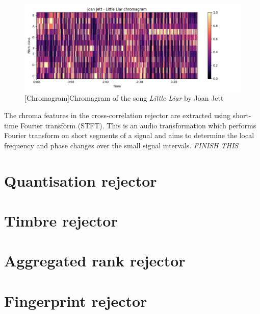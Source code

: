 \begin{figure}[H]
    \centering
    \includegraphics[width=\textwidth]{Algorithms/chromagram_picture.png}
    [Chromagram]{Chromagram of the song \textit{Little Liar} by Joan Jett}
    \label{fig:chromagram}
\end{figure}

The chroma features in the cross-correlation rejector are extracted using
short-time Fourier transform (STFT). This is an audio transformation which
performs Fourier transform on short segments of a signal and aims to determine
the local frequency and phase changes over the small signal intervals.
\textit{FINISH THIS}

\section{Quantisation rejector}
\label{sec:ccs}
\section{Timbre rejector} 
\label{sec:quantisation}
\section{Aggregated rank rejector} 
\label{sec:timbre}
\section{Fingerprint rejector} 
\label{sec:rankaggregation}

